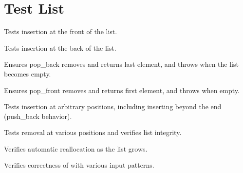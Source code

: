 \chapter{Test List}
\hypertarget{test}{}\label{test}

\begin{DoxyRefList}
\item[Member \doxylink{array__list__test_8cpp_ad52c9767625d96e5f3b2c7f838fbc5aa}{TEST} (array\+\_\+list, push\+\_\+front)]\label{test__test000001}%
%
Tests insertion at the front of the list.  
\item[Member \doxylink{array__list__test_8cpp_a44f247ad25b0c688c7a7b86b7735fb20}{TEST} (array\+\_\+list, push\+\_\+back)]\label{test__test000002}%
%
Tests insertion at the back of the list.  
\item[Member \doxylink{array__list__test_8cpp_a3abc1f4bf307f7ee24e99541434eb28b}{TEST} (array\+\_\+list, pop\+\_\+back)]\label{test__test000003}%
%
Ensures pop\+\_\+back removes and returns last element, and throws when the list becomes empty.  
\item[Member \doxylink{array__list__test_8cpp_a7a47d60bc92a0338e5204cdad42295f8}{TEST} (array\+\_\+list, pop\+\_\+front)]\label{test__test000004}%
%
Ensures pop\+\_\+front removes and returns first element, and throws when empty.  
\item[Member \doxylink{array__list__test_8cpp_a7aa0fc47a3c5618e030e1305ceb0deef}{TEST} (array\+\_\+list, insert)]\label{test__test000005}%
%
Tests insertion at arbitrary positions, including inserting beyond the end (push\+\_\+back behavior).  
\item[Member \doxylink{array__list__test_8cpp_ab58560c813af2c212ec09ab2965eb245}{TEST} (array\+\_\+list, remove)]\label{test__test000006}%
%
Tests removal at various positions and verifies list integrity.  
\item[Member \doxylink{array__list__test_8cpp_a62818dd134500f0616f1c3c24bef21b0}{TEST} (array\+\_\+list, reallocate)]\label{test__test000007}%
%
Verifies automatic reallocation as the list grows.  
\item[Member \doxylink{insertion__sort__test_8cpp_a9fd8881cbf2f181a9c80b3163ac5acb1}{TEST} (sort, insertion\+\_\+sort)]\label{test__test000008}%
%
Verifies correctness of  with various input patterns.  

\end{DoxyRefList}
